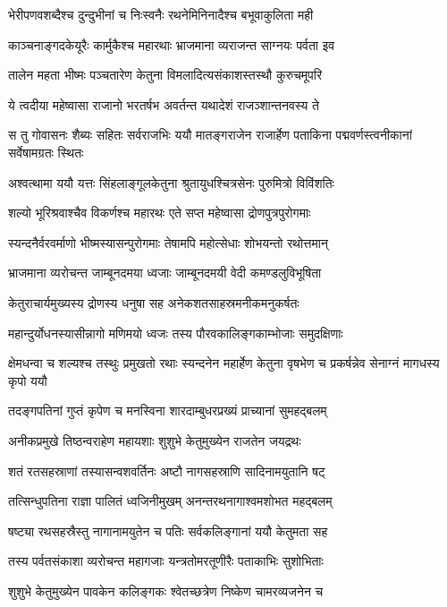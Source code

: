 \twolineshloka
{भेरीपणवशब्दैश्च दुन्दुभीनां च निःस्वनैः}
{रथनेमिनिनादैश्च बभूवाकुलिता मही}


\twolineshloka
{काञ्चनाङ्गदकेयूरैः कार्मुकैश्च महारथाः}
{भ्राजमाना व्यराजन्त साग्नयः पर्वता इव}


\twolineshloka
{तालेन महता भीष्मः पञ्चतारेण केतुना}
{विमलादित्यसंकाशस्तस्थौ कुरुचमूपरि}


\twolineshloka
{ये त्वदीया महेष्वासा राजानो भरतर्षभ}
{अवर्तन्त यथादेशं राजञ्शान्तनवस्य ते}


\threelineshloka
{स तु गोवासनः शैब्यः सहितः सर्वराजभिः}
{ययौ मातङ्गराजेन राजार्हेण पताकिना}
{पद्मवर्णस्त्वनीकानां सर्वेषामग्रतः स्थितः}


\twolineshloka
{अश्वत्थामा ययौ यत्तः सिंहलाङ्गूलकेतुना}
{श्रुतायुधश्चित्रसेनः पुरुमित्रो विविंशतिः}


\twolineshloka
{शल्यो भूरिश्रवाश्चैव विकर्णश्च महारथः}
{एते सप्त महेष्वासा द्रोणपुत्रपुरोगमाः}


\twolineshloka
{स्यन्दनैर्वरवर्माणो भीष्मस्यासन्पुरोगमाः}
{तेषामपि महोत्सेधाः शोभयन्तो रथोत्तमान्}


\twolineshloka
{भ्राजमाना व्यरोचन्त जाम्बूनदमया ध्वजाः}
{जाम्बूनदमयी वेदी कमण्डलुविभूषिता}


\twolineshloka
{केतुराचार्यमुख्यस्य द्रोणस्य धनुषा सह}
{अनेकशतसाहस्रमनीकमनुकर्षतः}


\twolineshloka
{महान्दुर्योधनस्यासीन्नागो मणिमयो ध्वजः}
{तस्य पौरवकालिङ्गकाम्भोजाः समुदक्षिणाः}


\threelineshloka
{क्षेमधन्वा च शल्यश्च तस्थुः प्रमुखतो रथाः}
{स्यन्दनेन महार्हेण केतुना वृषभेण च}
{प्रकर्षन्नेव सेनाग्नं मागधस्य कृपो ययौ}


\twolineshloka
{तदङ्गपतिनां गुप्तं कृपेण च मनस्विना}
{शारदाम्बुधरप्रख्यं प्राच्यानां सुमहद्बलम्}


\twolineshloka
{अनीकप्रमुखे तिष्ठन्वराहेण महायशाः}
{शुशुभे केतुमुख्येन राजतेन जयद्रथः}


\twolineshloka
{शतं रतसहस्राणां तस्यासन्वशवर्तिनः}
{अष्टौ नागसहस्राणि सादिनामयुतानि षट्}


\twolineshloka
{तत्सिन्धुपतिना राज्ञा पालितं ध्वजिनीमुखम्}
{अनन्तरथनागाश्वमशोभत महद्बलम्}


\twolineshloka
{षष्ट्या रथसहस्रैस्तु नागानामयुतेन च}
{पतिः सर्वकलिङ्गानां ययौ केतुमता सह}


\twolineshloka
{तस्य पर्वतसंकाशा व्यरोचन्त महागजाः}
{यन्त्रतोमरतूणीरैः पताकाभिः सुशोभिताः}


\twolineshloka
{शुशुभे केतुमुख्येन पावकेन कलिङ्गकः}
{श्वेतच्छत्रेण निष्केण चामरव्यजनेन च}


